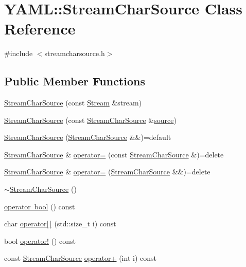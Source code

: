 \hypertarget{class_y_a_m_l_1_1_stream_char_source}{}\section{Y\+A\+ML\+::Stream\+Char\+Source Class Reference}
\label{class_y_a_m_l_1_1_stream_char_source}


{\ttfamily \#include $<$streamcharsource.\+h$>$}

\subsection*{Public Member Functions}
\begin{DoxyCompactItemize}
\item 
\mbox{\hyperlink{class_y_a_m_l_1_1_stream_char_source_a960dca86d416a4544437e26815bd8212}{Stream\+Char\+Source}} (const \mbox{\hyperlink{class_y_a_m_l_1_1_stream}{Stream}} \&stream)
\item 
\mbox{\hyperlink{class_y_a_m_l_1_1_stream_char_source_ad6af81e7c3484236365ffc3bba6a8812}{Stream\+Char\+Source}} (const \mbox{\hyperlink{class_y_a_m_l_1_1_stream_char_source}{Stream\+Char\+Source}} \&\mbox{\hyperlink{glad_8h_a6ffd2192cbc75d017665e95207ee36a7}{source}})
\item 
\mbox{\hyperlink{class_y_a_m_l_1_1_stream_char_source_a90b78998b066fd94124d5dfa0d93a97f}{Stream\+Char\+Source}} (\mbox{\hyperlink{class_y_a_m_l_1_1_stream_char_source}{Stream\+Char\+Source}} \&\&)=default
\item 
\mbox{\hyperlink{class_y_a_m_l_1_1_stream_char_source}{Stream\+Char\+Source}} \& \mbox{\hyperlink{class_y_a_m_l_1_1_stream_char_source_a304a3c561ea176995e8eaba9aff9bc60}{operator=}} (const \mbox{\hyperlink{class_y_a_m_l_1_1_stream_char_source}{Stream\+Char\+Source}} \&)=delete
\item 
\mbox{\hyperlink{class_y_a_m_l_1_1_stream_char_source}{Stream\+Char\+Source}} \& \mbox{\hyperlink{class_y_a_m_l_1_1_stream_char_source_aae079bdcd201ff0ca23027c85bfe5339}{operator=}} (\mbox{\hyperlink{class_y_a_m_l_1_1_stream_char_source}{Stream\+Char\+Source}} \&\&)=delete
\item 
\mbox{\hyperlink{class_y_a_m_l_1_1_stream_char_source_a3e0b178320a32a6ccba39c9fc1167abc}{$\sim$\+Stream\+Char\+Source}} ()
\item 
\mbox{\hyperlink{class_y_a_m_l_1_1_stream_char_source_a14f2c8d17985953b9260e95199e74adc}{operator bool}} () const
\item 
char \mbox{\hyperlink{class_y_a_m_l_1_1_stream_char_source_a33bec03d085b5fb2cdb859272ad3a19b}{operator\mbox{[}$\,$\mbox{]}}} (std\+::size\+\_\+t i) const
\item 
bool \mbox{\hyperlink{class_y_a_m_l_1_1_stream_char_source_a93e8c769996d96674b28de55524f4a88}{operator!}} () const
\item 
const \mbox{\hyperlink{class_y_a_m_l_1_1_stream_char_source}{Stream\+Char\+Source}} \mbox{\hyperlink{class_y_a_m_l_1_1_stream_char_source_a42bdd08d14c08f5fec190216b1c91e27}{operator+}} (int i) const
\end{DoxyCompactItemize}


